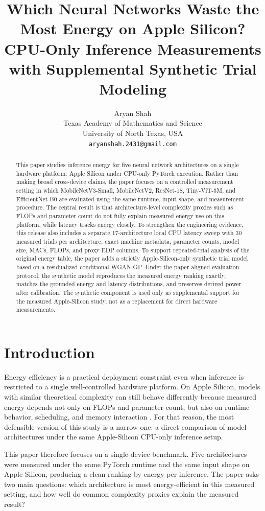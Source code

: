 \documentclass[11pt]{article}
\title{Which Neural Networks Waste the Most Energy on Apple Silicon?\\
\large CPU-Only Inference Measurements with Supplemental Synthetic Trial Modeling}
\author{Aryan Shah\\
Texas Academy of Mathematics and Science\\
University of North Texas, USA\\
\texttt{aryanshah.2431@gmail.com}}
\date{}
\begin{document}
\maketitle

\begin{abstract}
This paper studies inference energy for five neural network architectures on a
single hardware platform: Apple Silicon under CPU-only PyTorch execution.
Rather than making broad cross-device claims, the paper focuses on a controlled
measurement setting in which MobileNetV3-Small, MobileNetV2, ResNet-18,
Tiny-ViT-5M, and EfficientNet-B0 are evaluated using the same runtime, input
shape, and measurement procedure. The central result is that architecture-level
complexity proxies such as FLOPs and parameter count do not fully explain
measured energy use on this platform, while latency tracks energy closely. To
strengthen the engineering evidence, this release also includes a separate
17-architecture local CPU latency sweep with 30 measured trials per architecture,
exact machine metadata, parameter counts, model size, MACs, FLOPs, and proxy
EDP columns. To support repeated-trial analysis of the original energy table,
the paper adds a strictly Apple-Silicon-only synthetic trial model based on a
residualized conditional WGAN-GP. Under the paper-aligned evaluation protocol,
the synthetic model reproduces the measured energy ranking exactly, matches the
grounded energy and latency distributions, and preserves derived power after
calibration. The synthetic component is used only as supplemental support for
the measured Apple-Silicon study, not as a replacement for direct hardware
measurements.
\end{abstract}

\section{Introduction}
Energy efficiency is a practical deployment constraint even when inference is
restricted to a single well-controlled hardware platform. On Apple Silicon,
models with similar theoretical complexity can still behave differently because
measured energy depends not only on FLOPs and parameter count, but also on
runtime behavior, scheduling, and memory interaction
\cite{horowitz2014,mittal2019,hardwareaware2019}. For that reason, the most
defensible version of this study is a narrow one: a direct comparison of model
architectures under the same Apple-Silicon CPU-only inference setup.

This paper therefore focuses on a single-device benchmark. Five architectures
were measured under the same PyTorch runtime and the same input shape on Apple
Silicon, producing a clean ranking by energy per inference. The paper asks two
main questions: which architecture is most energy-efficient in this measured
setting, and how well do common complexity proxies explain the measured result?
\end{document}
